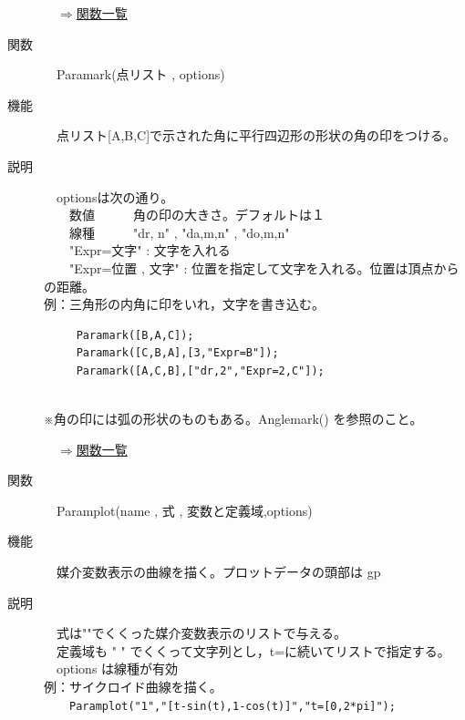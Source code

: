 \documentclass[papersize,a4paper,12pt,uplatex]{jsarticle}
\begin{document}
\begin{description}
\begin{flushright}　\hyperlink{functionlist}{$\Rightarrow$関数一覧}\end{flushright}
\hypertarget{paramark}{}
\item[関数]　Paramark(点リスト , options)
\item[機能]　点リスト[A,B,C]で示された角に平行四辺形の形状の角の印をつける。
\item[説明]　optionsは次の通り。\\
　　数値　　　角の印の大きさ。デフォルトは１\\
　　線種　　　"dr, n"  , "da,m,n" , "do,m,n"\\
　　"Expr=文字"  : 文字を入れる\\
　　"Expr=位置 , 文字"  : 位置を指定して文字を入れる。位置は頂点からの距離。\\

例：三角形の内角に印をいれ，文字を書き込む。
\begin{verbatim}
　　　Paramark([B,A,C]);
　　　Paramark([C,B,A],[3,"Expr=B"]);
　　　Paramark([A,C,B],["dr,2","Expr=2,C"]);
\end{verbatim}
　\\

※角の印には弧の形状のものもある。Anglemark() を参照のこと。\\

\begin{flushright}　\hyperlink{functionlist}{$\Rightarrow$関数一覧}\end{flushright}

\hypertarget{paramplot}{}
\item[関数]　Paramplot(name , 式 , 変数と定義域,options)
\item[機能]　媒介変数表示の曲線を描く。プロットデータの頭部は gp
\item[説明]　式は""でくくった媒介変数表示のリストで与える。\\
　定義域も " " でくくって文字列とし，t=に続いてリストで指定する。\\
　options は線種が有効\\

例：サイクロイド曲線を描く。\\
　　\verb|Paramplot("1","[t-sin(t),1-cos(t)]","t=[0,2*pi]");|\\


\end{description}
\end{document}
